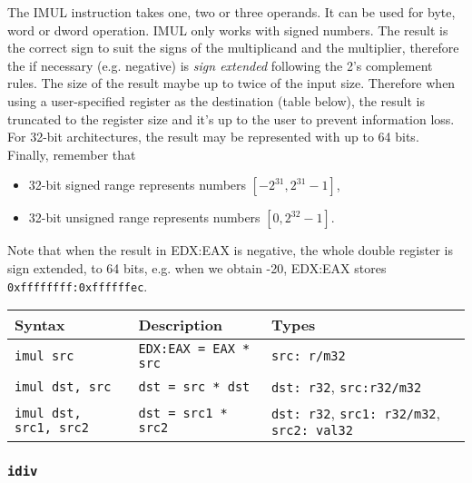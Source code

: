 \documentclass[a4paper]{article}
\begin{document}
The IMUL instruction takes one, two or three operands. It can be used for byte, word or dword operation. IMUL only works with signed numbers. The result is the correct sign to suit the signs of the multiplicand and the multiplier, therefore the if necessary (e.g. negative) is \textit{sign extended} following the 2's complement rules. The size of the result maybe up to twice of the input size. Therefore when using a user-specified register as the destination (table below), the result is truncated to the register size and it's up to the user to prevent information loss. For 32-bit architectures, the result may be represented with up to 64 bits. Finally, remember that 
\begin{itemize}
    \item 32-bit signed range represents numbers $[-2^{31},2^{31}-1]$,
    \item 32-bit unsigned range represents numbers $[0, 2^{32}-1]$.
\end{itemize}




Note that when the result in EDX:EAX is negative, the whole double register is sign extended, to 64 bits, e.g. when we obtain -20, EDX:EAX stores \texttt{0xffffffff:0xffffffec}.


\begin{tabular}{p{}p{}p{}} \toprule %
{Syntax} & {Description} & {Types} \\ \midrule
    \texttt{imul src} & {\texttt{EDX:EAX = EAX * src}} & {\texttt{src: r/m32}} \\
    
    \texttt{imul dst, src} & {\texttt{dst = src * dst}} & {\texttt{dst: r32}, \texttt{src:r32/m32}}\\
    \texttt{imul dst, src1, src2} & {\texttt{dst = src1 * src2}} & {\texttt{dst: r32},
    \texttt{src1: r32/m32}, \texttt{src2: val32}} \\ \bottomrule
\end{tabular}


\subsubsection{\texttt{idiv}}
\end{document}
